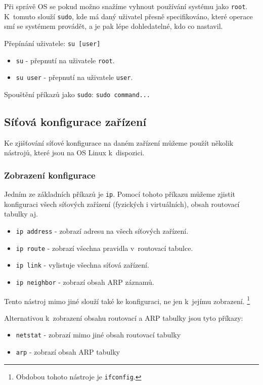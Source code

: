 Při správě OS se pokud možno snažíme vyhnout používání systému jako \texttt{root}. K~tomuto slouží \texttt{sudo},
kde má daný uživatel přesně specifikováno, které operace smí se systémem provádět, a je pak lépe dohledatelné,
kdo co nastavil.

Přepínání uživatele:
\texttt{su [user]}
\begin{itemize}
				\item \texttt{su} - přepnutí na uživatele \texttt{root}.
				\item \texttt{su user} - přepnutí na uživatele \texttt{user}.
\end{itemize}

Spouštění příkazů jako \texttt{sudo}:
\texttt{sudo command...}


\subsection{Síťová konfigurace zařízení}
Ke zjišťování síťové konfigurace na daném zařízení můžeme použít několik nástrojů,
které jsou na OS Linux k~dispozici.

\subsubsection{Zobrazení konfigurace}
Jedním ze základních příkazů je \texttt{ip}. Pomocí tohoto příkazu můžeme zjistit
konfiguraci všech síťových zařízení (fyzických i virtuálních), obsah routovací tabulky aj.

\begin{itemize}
				\item \texttt{ip address} - zobrazí adresu na všech síťových zařízení.
				\item \texttt{ip route} - zobrazí všechna pravidla v~routovací tabulce.
				\item \texttt{ip link} - vylistuje všechna síťová zařízení.
				\item \texttt{ip neighbor} - zobrazí obsah ARP záznamů.
\end{itemize}

Tento nástroj mimo jiné slouží také ke konfiguraci, ne jen k~jejímu zobrazení. \footnote{Obdobou tohoto nástroje je \texttt{ifconfig}.}


Alternativou k~zobrazení obsahu routovací a ARP tabulky jsou tyto příkazy:
\begin{itemize}
\item \texttt{netstat} - zobrazí mimo jiné obsah routovací tabulky
\item \texttt{arp} - zobrazí obsah ARP tabulky
\end{itemize}



